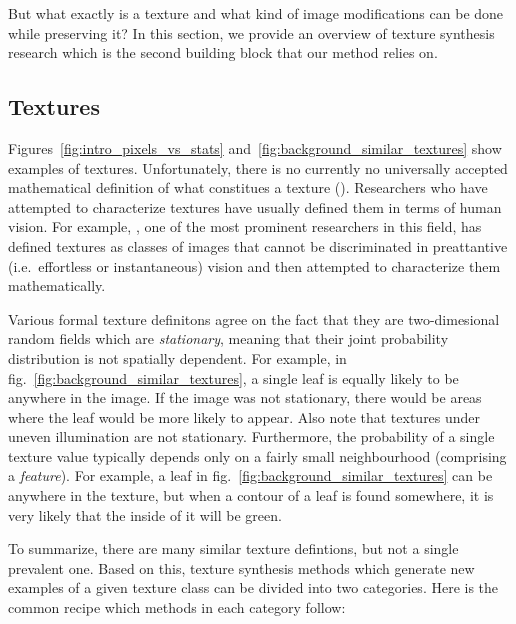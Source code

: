 But what exactly is a texture and what kind of image modifications can be done while preserving it? In this section, we provide an overview of texture synthesis research which is the second building block that our method relies on.

\subsection{Textures}
\label{section:background-texture_synthesis-textures}

Figures~\ref{fig:intro_pixels_vs_stats} and~\ref{fig:background_similar_textures} show examples of textures. Unfortunately, there is no currently no universally accepted mathematical definition of what constitues a texture (\citet{Raad2018}). Researchers who have attempted to characterize textures have usually defined them in terms of human vision. For example, \citet{Julesz1962}, one of the most prominent researchers in this field, has defined textures as classes of images that cannot be discriminated in preattantive (i.e.~effortless or instantaneous) vision and then attempted to characterize them mathematically.

Various formal texture definitons agree on the fact that they are two-dimesional random fields which are \textit{stationary}, meaning that their joint probability distribution is not spatially dependent. For example, in fig.~\ref{fig:background_similar_textures}, a single leaf is equally likely to be anywhere in the image. If the image was not stationary, there would be areas where the leaf would be more likely to appear. Also note that textures under uneven illumination are not stationary. Furthermore, the probability of a single texture value typically depends only on a fairly small neighbourhood (comprising a \textit{feature}). For example, a leaf in fig.~\ref{fig:background_similar_textures} can be anywhere in the texture, but when a contour of a leaf is found somewhere, it is very likely that the inside of it will be green. 

To summarize, there are many similar texture defintions, but not a single prevalent one. Based on this, texture synthesis methods which generate new examples of a given texture class can be divided into two categories. Here is the common recipe which methods in each category follow:


